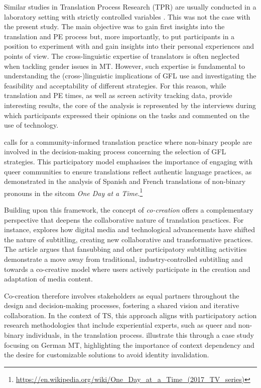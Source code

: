 Similar studies in Translation Process Research (TPR) are usually conducted in a laboratory setting with strictly controlled variables \citep{carl2015post,jia2019does,nitzke2019problem}. This was not the case with the present study. The main objective was to gain first insights into the translation and PE process but, more importantly, to put participants in a position to experiment with  and gain insights into their personal experiences and points of view. The cross-linguistic expertise of translators is often neglected when tackling gender issues in MT. However, such expertise is fundamental to understanding the (cross-)linguistic implications of GFL use and investigating the feasibility and acceptability of different strategies. For this reason, while translation and PE times, as well as screen activity tracking data, provide interesting results, the core of the analysis is represented by the interviews during which participants expressed their opinions on the tasks and commented on the use of technology. 

\textcite{attig2023call} calls for a community-informed translation practice where non-binary people are involved in the decision-making process concerning the selection of GFL strategies. This participatory model emphasises the importance of engaging with queer communities to ensure translations reflect authentic language practices, as demonstrated in the analysis of Spanish and French translations of non-binary pronouns in the sitcom \textit{One Day at a Time}.\footnote{\url{https://en.wikipedia.org/wiki/One_Day_at_a_Time_(2017_TV_series)}}

Building upon this framework, the concept of \textit{co-creation} offers a complementary perspective that deepens the collaborative nature of translation practices. For instance, \textcite{perez2013co} explores how digital media and technological advancements have shifted the nature of subtitling, creating new collaborative and transformative practices. The article argues that fansubbing and other participatory subtitling activities demonstrate a move away from traditional, industry-controlled subtitling and towards a co-creative model where users actively participate in the creation and adaptation of media content. 

Co-creation therefore involves stakeholders as equal partners throughout the design and decision-making processes, fostering a shared vision and iterative collaboration. In the context of TS, this approach aligns with participatory action research methodologies that include experiential experts, such as queer and non-binary individuals, in the translation process. \textcite{gromann2023participatory} illustrate this through a case study focusing on German MT, highlighting the importance of context dependency and the desire for customizable solutions to avoid identity invalidation.

